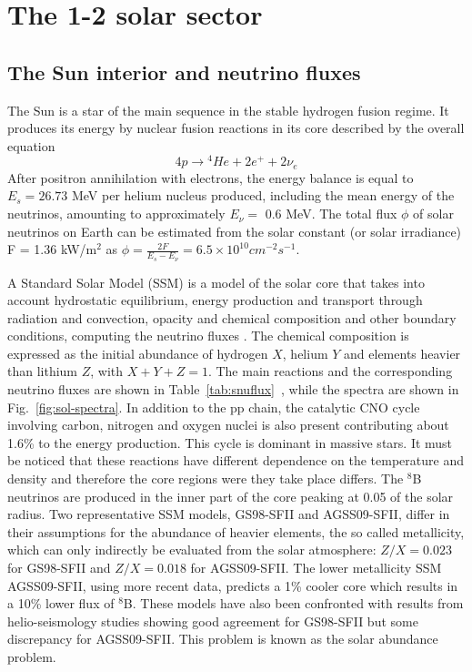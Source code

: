 \section{The 1-2 solar sector}
\label{sec:solar}

\subsection{The Sun interior and neutrino fluxes}

The Sun is a star of the main sequence in the stable hydrogen fusion regime. It produces its energy by nuclear fusion reactions in its core described by the overall equation
\begin{equation}
4p \rightarrow {^4}He + 2 e^+ + 2 \nu_e
\end{equation}
After positron annihilation with electrons, the energy balance is equal to $E_s =26.73$ MeV per helium nucleus produced, including the mean energy of the neutrinos, amounting to approximately $E_\nu =$ 0.6 MeV. The total flux $\phi$ of solar neutrinos on Earth can be estimated from the solar constant (or solar irradiance) F = 1.36 kW/m$^2$  as
$\phi = \frac{2F}{E_s - E_\nu} = 6.5 \times 10^{10} cm^{-2} s^{-1}$.

A Standard Solar Model (SSM) is a model of the solar core that takes into account hydrostatic equilibrium, energy production and transport through radiation and convection, opacity and chemical composition and other boundary conditions, computing the neutrino fluxes \cite{bahcall89}. The chemical composition is expressed as the initial abundance of hydrogen $X$, helium $Y$ and elements heavier than lithium $Z$, with $X+Y+Z = 1$.
The main reactions and the corresponding neutrino fluxes are shown in Table~\ref{tab:snuflux}~\cite{serenelli}, while the spectra are shown in Fig.~\ref{fig:sol-spectra}. 
In addition to the pp chain, the catalytic CNO cycle involving carbon, nitrogen and oxygen nuclei is also present contributing about 1.6\% to the energy production.
This cycle is dominant in massive stars.
It must be noticed that these reactions have different dependence on the temperature and density and therefore the core regions were they take place differs. The $^8$B neutrinos are produced in the inner part of the core peaking at 0.05 of the solar radius. 
Two representative SSM models, GS98-SFII and AGSS09-SFII, differ in their assumptions for the abundance of heavier elements, the so called metallicity, which can only indirectly be evaluated from the solar atmosphere: $Z/X=0.023$ for GS98-SFII and $Z/X=0.018$ for AGSS09-SFII. 
The lower metallicity SSM AGSS09-SFII, using more recent data, predicts a 1\% cooler core which results in a 10\% lower flux of $^8$B. These models have also been confronted with results from helio-seismology studies showing good agreement for GS98-SFII but some discrepancy for AGSS09-SFII. This problem is known as the solar abundance problem.

